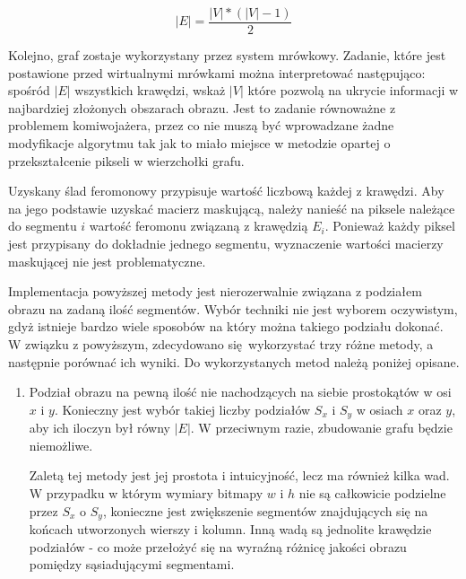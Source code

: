 {{{            \begin{equation}\label{eqt:edge-based-converter-cond}
                |E| = \frac{|V| * (|V| - 1)}{2}
            \end{equation}

            Kolejno, graf zostaje wykorzystany przez system mrówkowy. Zadanie, które jest postawione przed wirtualnymi
            mrówkami można interpretować następująco: spośród $|E|$ wszystkich krawędzi, wskaż $|V|$ które pozwolą
            na ukrycie informacji w najbardziej złożonych obszarach obrazu. Jest to zadanie równoważne z problemem
            komiwojażera, przez co nie muszą być wprowadzane żadne modyfikacje algorytmu tak jak to miało miejsce w
            metodzie opartej o przekształcenie pikseli w wierzchołki grafu.

            Uzyskany ślad feromonowy przypisuje wartość liczbową każdej z krawędzi. Aby na jego podstawie uzyskać
            macierz maskującą, należy nanieść na piksele należące do segmentu $i$ wartość feromonu związaną z krawędzią
            $E_i$. Ponieważ każdy piksel jest przypisany do dokładnie jednego segmentu, wyznaczenie wartości macierzy
            maskującej nie jest problematyczne.

            Implementacja powyższej metody jest nierozerwalnie związana z podziałem obrazu na zadaną ilość segmentów.
            Wybór techniki nie jest wyborem oczywistym, gdyż istnieje bardzo wiele sposobów na który można takiego
            podziału dokonać. W związku z powyższym, zdecydowano się wykorzystać trzy różne metody, a następnie porównać
            ich wyniki. Do wykorzystanych metod należą poniżej opisane.

            \begin{enumerate}
                \item Podział obrazu na pewną ilość nie nachodzących na siebie prostokątów w osi $x$ i $y$. Konieczny
                jest wybór takiej liczby podziałów $S_x$ i $S_y$ w osiach $x$ oraz $y$, aby ich iloczyn był równy $|E|$.
                W przeciwnym razie, zbudowanie grafu będzie niemożliwe.

                Zaletą tej metody jest jej prostota i intuicyjność, lecz ma również kilka wad. W przypadku w którym
                wymiary bitmapy $w$ i $h$ nie są całkowicie podzielne przez $S_x$ o $S_y$, konieczne jest zwiększenie
                segmentów znajdujących się na końcach utworzonych wierszy i kolumn. Inną wadą są jednolite krawędzie
                podziałów - co może przełożyć się na wyraźną różnicę jakości obrazu pomiędzy sąsiadującymi segmentami.


\end{enumerate}}}}

